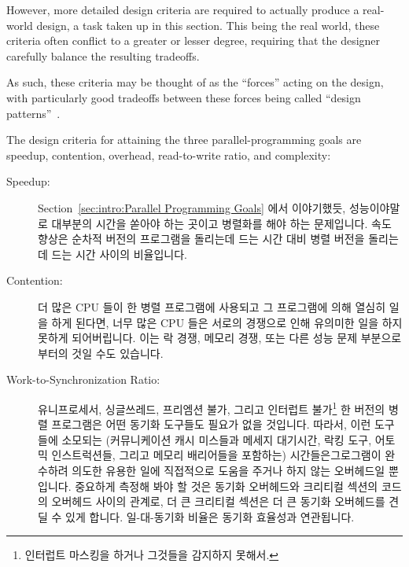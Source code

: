 However, more detailed design criteria are required to
actually produce a real-world design, a task taken up in this section.
This being the real world, these criteria often conflict to a
greater or lesser degree, requiring that the designer carefully
balance the resulting tradeoffs.

As such, these criteria may be thought of as the ``forces''
acting on the design, with particularly good tradeoffs between
these forces being called ``design patterns''~\cite{Alexander79,GOF95}.

The design criteria for attaining the three parallel-programming goals
are speedup,
contention, overhead, read-to-write ratio, and complexity:
\fi
\begin{description}
\item[Speedup:]  Section~\ref{sec:intro:Parallel Programming Goals} 에서
	이야기했듯, 성능이야말로 대부분의 시간을 쏟아야 하는 곳이고 병렬화를
	해야 하는 문제입니다.
	속도 향상은 순차적 버전의 프로그램을 돌리는데 드는 시간 대비 병렬
	버전을 돌리는데 드는 시간 사이의 비율입니다.
\item[Contention:]  더 많은 CPU 들이 한 병렬 프로그램에 사용되고 그 프로그램에
	의해 열심히 일을 하게 된다면, 너무 많은 CPU 들은 서로의 경쟁으로 인해
	유의미한 일을 하지 못하게 되어버립니다.
	이는 락 경쟁, 메모리 경쟁, 또는 다른 성능 문제 부분으로부터의 것일 수도
	있습니다.
\iffalse

\item[Speedup:]  As noted in
	Section~\ref{sec:intro:Parallel Programming Goals},
	increased performance is the major reason
	to go to all of the time and trouble
	required to parallelize it.
	Speedup is defined to be the ratio of the time required
	to run a sequential version of the program to the time
	required to run a parallel version.
\item[Contention:]  If more CPUs are applied to a parallel
	program than can be kept busy by that program,
	the excess CPUs are prevented from doing
	useful work by contention.
	This may be lock contention, memory contention, or a host
	of other performance killers.
\fi
\item[Work-to-Synchronization Ratio:]  유니프로세서, 싱글쓰레드, 프리엠션 불가,
	그리고 인터럽트 불가\footnote{
		인터럽트 마스킹을 하거나 그것들을 감지하지 못해서.}
	한 버전의 병렬 프로그램은 어떤 동기화 도구들도 필요가 없을 것입니다.
	따라서, 이런 도구들에 소모되는 (커뮤니케이션 캐시 미스들과 메세지
	대기시간, 락킹 도구, 어토믹 인스트럭션들, 그리고 메모리 배리어들을
	포함하는) 시간들은그로그램이 완수하려 의도한 유용한 일에 직접적으로
	도움을 주거나 하지 않는 오버헤드일 뿐입니다.
	중요하게 측정해 봐야 할 것은 동기화 오버헤드와 크리티컬 섹션의 코드의
	오버헤드 사이의 관계로, 더 큰 크리티컬 섹션은 더 큰 동기화 오버헤드를
	견딜 수 있게 합니다.
	일-대-동기화 비율은 동기화 효율성과 연관됩니다.
\iffalse


\end{description}
